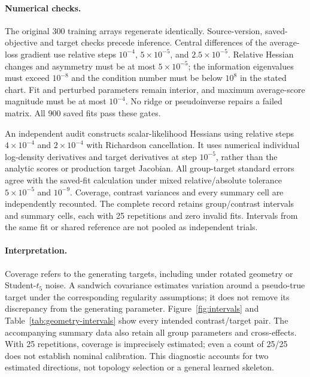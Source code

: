 \paragraph{Numerical checks.}
The original 300 training arrays regenerate identically. Source-version,
saved-objective and target checks precede inference. Central differences of
the average-loss gradient use relative steps $10^{-4}$, $5\times10^{-5}$,
and $2.5\times10^{-5}$. Relative Hessian changes and asymmetry must be at
most $5\times10^{-5}$; the information eigenvalues must exceed $10^{-8}$
and the condition number must be below $10^8$ in the stated chart. Fit and
perturbed parameters remain interior, and maximum average-score magnitude
must be at most $10^{-4}$. No ridge or pseudoinverse repairs a failed matrix.
All 900 saved fits pass these gates.

An independent audit constructs scalar-likelihood Hessians using relative
steps $4\times10^{-4}$ and $2\times10^{-4}$ with Richardson cancellation.
It uses numerical individual log-density derivatives and target derivatives
at step $10^{-5}$, rather than the analytic scores or production target
Jacobian. All group-target standard errors agree with the saved-fit
calculation under mixed relative/absolute tolerance $5\times10^{-5}$ and
$10^{-9}$. Coverage, contrast variances and every summary cell are
independently recounted. The complete record retains
\GeoIntervalCount{} group/contrast intervals and \GeoSummaryCount{} summary
cells, each with 25 repetitions and zero invalid fits. Intervals from the
same fit or shared reference are not pooled as independent trials.

\paragraph{Interpretation.}
Coverage refers to the generating targets, including under rotated geometry
or Student-$t_5$ noise. A sandwich covariance estimates variation around a
pseudo-true target under the corresponding regularity assumptions; it does
not remove its discrepancy from the generating parameter. Figure~\ref{fig:intervals}
and Table~\ref{tab:geometry-intervals} show every intended contrast/target
pair. The accompanying summary data also retain all group parameters and
cross-effects. With 25 repetitions, coverage is imprecisely estimated;
even a count of 25/25 does not establish nominal calibration. This diagnostic
accounts for two estimated directions, not topology selection or a general
learned skeleton.

